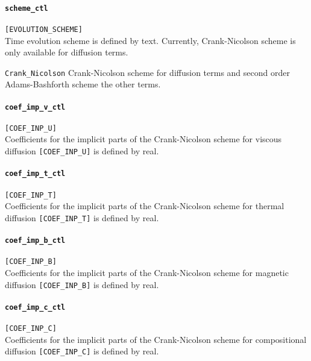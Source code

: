 \paragraph{\tt scheme\_ctl}
\label{href_t:scheme_ctl}
\verb|[EVOLUTION_SCHEME]| \\
Time evolution scheme is defined by text. Currently, Crank-Nicolson scheme is only available for diffusion terms.
%
\begin{description}
\item{\tt Crank\_Nicolson} Crank-Nicolson scheme for diffusion terms and second order Adams-Bashforth scheme the other terms.
\end{description}
%

\paragraph{\tt coef\_imp\_v\_ctl}
\label{href_t:coef_imp_v_ctl}
\verb|[COEF_INP_U]| \\
Coefficients for the implicit parts of the Crank-Nicolson scheme for viscous diffusion \verb|[COEF_INP_U]| is defined by real.

\paragraph{\tt coef\_imp\_t\_ctl}
\label{href_t:coef_imp_t_ctl}
\verb|[COEF_INP_T]| \\
Coefficients for the implicit parts of the Crank-Nicolson scheme for thermal diffusion \verb|[COEF_INP_T]| is defined by real.

\paragraph{\tt coef\_imp\_b\_ctl}
\label{href_t:coef_imp_b_ctl}
\verb|[COEF_INP_B]| \\
Coefficients for the implicit parts of the Crank-Nicolson scheme for magnetic diffusion \verb|[COEF_INP_B]| is defined by real.

\paragraph{\tt coef\_imp\_c\_ctl}
\label{href_t:coef_imp_c_ctl}
\verb|[COEF_INP_C]| \\
Coefficients for the implicit parts of the Crank-Nicolson scheme for compositional diffusion \verb|[COEF_INP_C]| is defined by real. 


